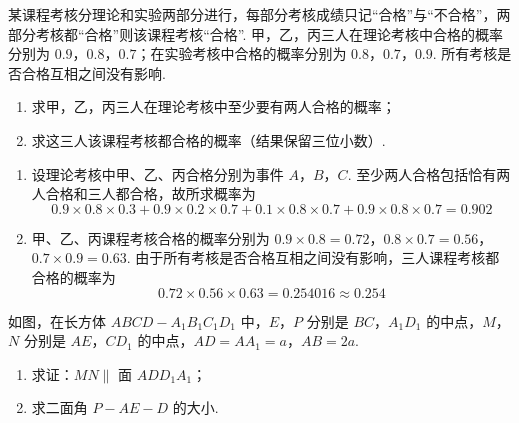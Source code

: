 \begin{problem}
某课程考核分理论和实验两部分进行，每部分考核成绩只记“合格”与“不合格”，两部分考核都“合格”则该课程考核“合格”. 甲，乙，丙三人在理论考核中合格的概率分别为 \(0.9\)，\(0.8\)，\(0.7\)；在实验考核中合格的概率分别为 \(0.8\)，\(0.7\)，\(0.9\). 所有考核是否合格互相之间没有影响.

\begin{enumerate}
\item 求甲，乙，丙三人在理论考核中至少要有两人合格的概率；
\item 求这三人该课程考核都合格的概率（结果保留三位小数）.
\end{enumerate}
\end{problem}

\begin{solution}
\begin{enumerate}
\item 设理论考核中甲、乙、丙合格分别为事件 \(A\)，\(B\)，\(C\). 至少两人合格包括恰有两人合格和三人都合格，故所求概率为
\[
0.9\times0.8\times0.3+0.9\times0.2\times0.7+0.1\times0.8\times0.7+0.9\times0.8\times0.7=0.902
\]

\item 甲、乙、丙课程考核合格的概率分别为 \(0.9\times0.8=0.72\)，\(0.8\times0.7=0.56\)，\(0.7\times0.9=0.63\). 由于所有考核是否合格互相之间没有影响，三人课程考核都合格的概率为
\[
0.72\times0.56\times0.63=0.254016\approx0.254
\]
\end{enumerate}
\end{solution}

\begin{problem}
如图，在长方体 \(ABCD - A_{1}B_{1}C_{1}D_{1}\) 中，\(E\)，\(P\) 分别是 \(BC\)，\(A_{1}D_{1}\) 的中点，\(M\)，\(N\) 分别是 \(AE\)，\(CD_{1}\) 的中点，\(AD = AA_{1} = a\)，\(AB = 2a\).
\begin{enumerate}
\item 求证：\(MN \parallel\) 面 \(ADD_{1}A_{1}\)；
\item 求二面角 \(P - AE - D\) 的大小.
\end{enumerate}

\end{problem}


